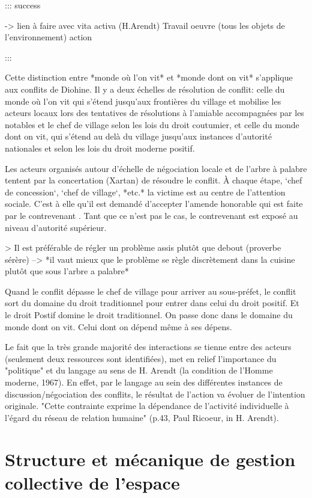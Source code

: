 ::: success

 -> lien à faire avec vita activa (H.Arendt)
Travail 
oeuvre (tous les objets de l'environnement) 
action 

:::



Cette distinction entre *monde où l'on vit* et *monde dont on vit* s'applique aux conflits de Diohine. Il y a deux échelles de résolution de conflit:  celle du monde où l'on vit qui s'étend jusqu'aux frontières du village et mobilise les acteurs locaux lors des tentatives de résolutions à l'amiable accompagnées par les notables et le chef de village selon les lois du droit coutumier,  et celle du monde dont on vit, qui s'étend au delà du village jusqu'aux instances d'autorité nationales et selon les lois du droit moderne positif. 

Les acteurs organisés autour d’échelle de négociation locale et de l'arbre à palabre tentent par la concertation (Xartan) de résoudre le conflit. À chaque étape, `chef de concession`, `chef de village`, *etc.* la victime est au centre de l'attention sociale. C'est à elle qu'il est demandé d'accepter l'amende honorable qui est faite par le contrevenant
. Tant que ce n'est pas le cas, le contrevenant est exposé au niveau d'autorité supérieur.

> Il est préférable de régler un problème assis plutôt que debout (proverbe sérère) --> *il vaut mieux que le problème se règle discrètement dans la cuisine plutôt que sous l'arbre a palabre*

Quand le conflit dépasse le chef de village pour arriver au sous-préfet, le conflit sort du domaine du droit traditionnel pour entrer dans celui du droit positif. Et le droit Postif domine le droit traditionnel. On passe donc dans le domaine du monde dont on vit. Celui dont on dépend même à ses dépens.

Le fait que la très grande majorité des interactions se tienne  entre des  acteurs (seulement deux ressources sont identifiées), met en relief l'importance du "politique" et du langage au sens de H. Arendt (la condition de l'Homme moderne, 1967). En effet, par le langage au sein des différentes instances de discussion/négociation des conflits, le résultat de l'action va évoluer de l'intention originale. "Cette contrainte exprime la dépendance de l'activité individuelle à l'égard du réseau de relation humaine" (p.43, Paul Ricoeur, in H. Arendt).

\section{Structure et mécanique de gestion collective de l'espace}

